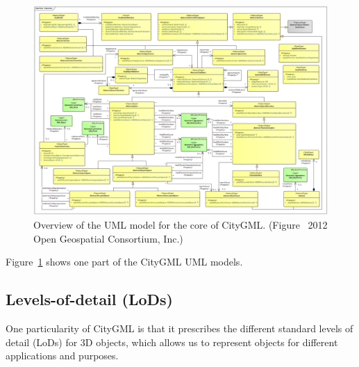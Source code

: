 \begin{figure}
  \centering
  \includegraphics[width=0.95\linewidth]{figs/citygml_uml_core}
  \caption{Overview of the UML model for the core of CityGML\@. (Figure \textcopyright\ 2012 Open Geospatial Consortium, Inc.)}%
\label{fig:citygml_uml_core}
\end{figure}
Figure~\ref{fig:citygml_uml_core} shows one part of the CityGML UML models.

%

\subsection{Levels-of-detail (LoDs)} 

One particularity of CityGML is that it prescribes the different standard levels of detail (LoDs) for 3D objects, which allows us to represent objects for different applications and purposes.

